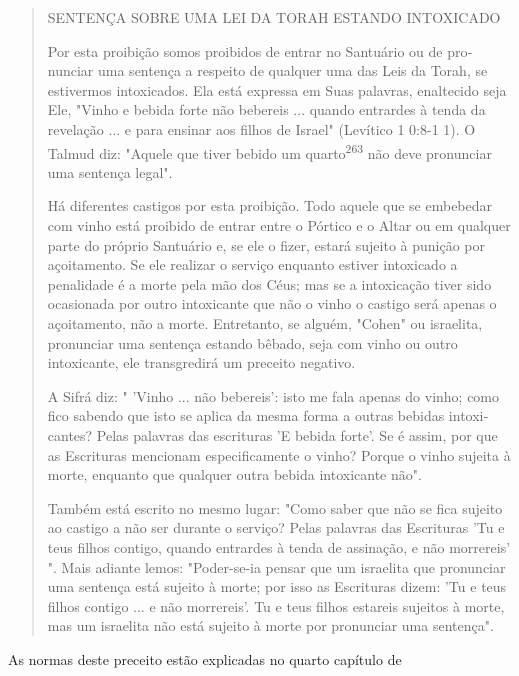\begin{quote}
SENTENÇA SOBRE UMA LEI DA TORAH ESTANDO INTOXICADO

Por esta proibição somos proibidos de entrar no Santuário ou de
pro­nunciar uma sentença a respeito de qualquer uma das Leis da Torah,
se estiver­mos intoxicados. Ela está expressa em Suas palavras,
enaltecido seja Ele, "Vi­nho e bebida forte não bebereis ... quando
entrardes à tenda da revelação ... e para ensinar aos filhos de Israel"
(Levítico 1 0:8-1 1). O Talmud diz: "Aquele que tiver bebido um
quarto\textsuperscript{263} não deve pronunciar uma sentença legal".

Há diferentes castigos por esta proibição. Todo aquele que se embe­bedar
com vinho está proibido de entrar entre o Pórtico e o Altar ou em
qual­quer parte do próprio Santuário e, se ele o fizer, estará sujeito à
punição por açoitamento. Se ele realizar o serviço enquanto estiver
intoxicado a penalidade é a morte pela mão dos Céus; mas se a
intoxicação tiver sido ocasionada por outro intoxicante que não o vinho
o castigo será apenas o açoitamento, não a morte. Entretanto, se alguém,
"Cohen" ou israelita, pronunciar uma senten­ça estando bêbado, seja com
vinho ou outro intoxicante, ele transgredirá um preceito negativo.

A Sifrá diz: " 'Vinho ... não bebereis': isto me fala apenas do vinho;
como fico sabendo que isto se aplica da mesma forma a outras bebidas
intoxi­cantes? Pelas palavras das escrituras 'E bebida forte'. Se é
assim, por que as Es­crituras mencionam especificamente o vinho? Porque
o vinho sujeita à morte, enquanto que qualquer outra bebida intoxicante
não".

Também está escrito no mesmo lugar: "Como saber que não se fica sujeito
ao castigo a não ser durante o serviço? Pelas palavras das Escrituras
'Tu e teus filhos contigo, quando entrardes à tenda de assinação, e não
morrereis' ". Mais adiante lemos: "Poder-se-ia pensar que um israelita
que pronunciar uma sentença está sujeito à morte; por isso as Escrituras
dizem: 'Tu e teus filhos con­tigo ... e não morrereis'. Tu e teus filhos
estareis sujeitos à morte, mas um israe­lita não está sujeito à morte
por pronunciar uma sentença".
\end{quote}

As normas deste preceito estão explicadas no quarto capítulo de

